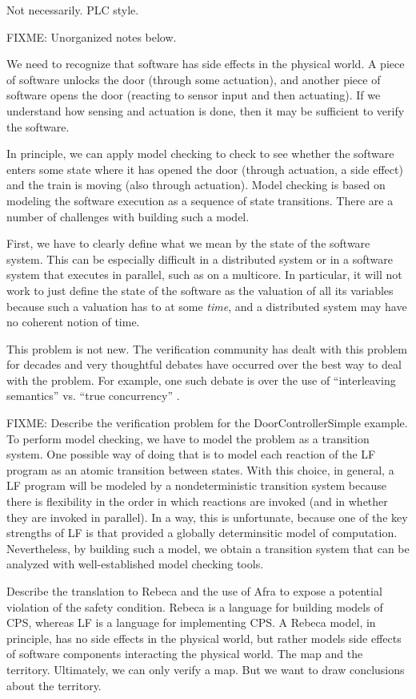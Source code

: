 \documentclass{article}
\begin{document}
Not necessarily.  PLC style.

FIXME: Unorganized notes below.

We need to recognize that software has side effects in the physical world.
A piece of software unlocks the door (through some actuation), and another piece of software opens the door
(reacting to sensor input and then actuating).
If we understand how sensing and actuation is done, then it may be sufficient to verify the software.

In principle, we can apply model checking \cite{FIXME} to check to see whether the software enters some
state where it has opened the door (through actuation, a side effect) and the train is moving (also through
actuation).
Model checking is based on modeling the software execution as a sequence of state transitions.
There are a number of challenges with building such a model.

First, we have to clearly define what we mean by the state of the software system.
This can be especially difficult in a distributed system or in a software system that executes in parallel,
such as on a multicore.
In particular, it will not work to just define the state of the software as the valuation of all its variables
because such a valuation has to at some \emph{time}, and a distributed system may have no coherent notion
of time.

This problem is not new.
The verification community has dealt with this problem for decades
and very thoughtful debates have occurred over the best way to deal with the problem.
For example, one such debate is over the use of ``interleaving semantics'' vs. ``true concurrency'' \cite{FIXME}.


FIXME: Describe the verification problem for the DoorControllerSimple example.
To perform model checking, we have to model the problem as a transition system.
One possible way of doing that is to model each reaction of the LF program as an atomic transition between states.
With this choice, in general, a LF program will be modeled by a nondeterministic transition system because
there is flexibility in the order in which reactions are invoked (and in whether they are invoked in parallel).
In a way, this is unfortunate, because one of the key strengths of LF is that provided a globally
determinsitic model of computation. Nevertheless, by building such a model, we obtain a transition
system that can be analyzed with well-established model checking tools.

Describe the translation to Rebeca and the use of Afra to expose a potential violation of the safety condition.
Rebeca is a language for building models of CPS, whereas LF is a language for implementing CPS.
A Rebeca model, in principle, has no side effects in the physical world, but rather models
side effects of software components interacting the physical world.
The map and the territory.
Ultimately, we can only verify a map.
But we want to draw conclusions about the territory.
\end{document}
